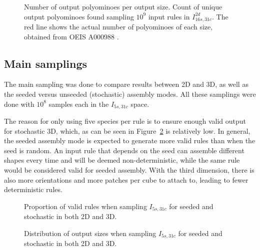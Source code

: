 \begin{figure}[h]
    \centering
    \caption{Number of output polyominoes per output size. Count of unique output polyominoes found sampling \(10^9\) input rules in \(I_{16s,31c}^{2d}\). The red line shows the actual number of polyominoes of each size, obtained from OEIS A000988 \cite{sloane1995encyclopedia, oeisA000988}.
    }
    \label{fig:ref_distr}
\end{figure}


\subsection{Main samplings}
\label{sec:maincalc}



The main sampling was done to compare results between 2D and 3D, as well as the seeded versus unseeded (stochastic) assembly modes. All these samplings were done with \(10^8\) samples each in the \(I_{5s,31c}\) space.

The reason for only using five species per rule is to ensure enough valid output for stochastic 3D, which, as can be seen in Figure~\ref{fig:valid_proportion} is relatively low. In general, the seeded assembly mode is expected to generate more valid rules than when the seed is random. An input rule that depends on the seed can assemble different shapes every time and will be deemed non-deterministic, while the same rule would be considered valid for seeded assembly. With the third dimension, there is also more orientations and more patches per cube to attach to, leading to fewer deterministic rules.


\begin{figure}[h]
    \centering
    \caption{Proportion of valid rules when sampling \(I_{5s,31c}\) for seeded and stochastic in both 2D and 3D.}
    \label{fig:valid_proportion}
\end{figure}


\begin{figure}[h]
    \centering
    \caption{Distribution of output sizes when sampling \(I_{5s,31c}\) for seeded and stochastic in both 2D and 3D.}
\end{figure}

